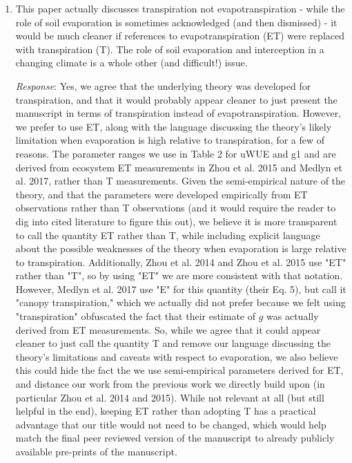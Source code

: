 \documentclass[12pt]{article}
\begin{document}
\begin{enumerate}

\item This paper actually discusses transpiration not
  evapotranspiration - while the role of soil evaporation is sometimes
  acknowledged (and then dismissed) - it would be much cleaner if
  references to evapotranspiration (ET) were replaced with
  transpiration (T). The role of soil evaporation and interception in
  a changing climate is a whole other (and difficult!) issue.

  \textit{Response}: Yes, we agree that the underlying theory was
  developed for transpiration, and that it would probably appear
  cleaner to just present the manuscript in terms of transpiration
  instead of evapotranspiration. However, we prefer to use ET, along
  with the language discussing the theory's likely limitation when
  evaporation is high relative to transpiration, for a few of
  reasons. The parameter ranges we use in Table 2 for uWUE and g1 and
  are derived from ecosystem ET measurements in Zhou et al. 2015 and
  Medlyn et al. 2017, rather than T measurements. Given the
  semi-empirical nature of the theory, and that the parameters were
  developed empirically from ET observations rather than T
  observations (and it would require the reader to dig into cited
  literature to figure this out), we believe it is more transparent to
  call the quantity ET rather than T, while including explicit
  language about the possible weaknesses of the theory when
  evaporation is large relative to transpiration. Additionally, Zhou
  et al. 2014 and Zhou et al. 2015 use "ET" rather than "T", so by
  using "ET" we are more consistent with that notation. However,
  Medlyn et al. 2017 use "E" for this quantity (their Eq. 5), but call
  it "canopy transpiration," which we actually did not prefer because
  we felt using "transpiration" obfuscated the fact that their
  estimate of $g$ was actually derived from ET measurements. So, while
  we agree that it could appear cleaner to just call the quantity T
  and remove our language discussing the theory's limitations and
  caveats with respect to evaporation, we also believe this could hide
  the fact the we use semi-empirical parameters derived for ET, and
  distance our work from the previous work we directly build upon (in
  particular Zhou et al. 2014 and 2015). While not relevant at all
  (but still helpful in the end), keeping ET rather than adopting T
  has a practical advantage that our title would not need to be
  changed, which would help match the final peer reviewed version of
  the manuscript to already publicly available pre-prints of the
  manuscript.


\end{enumerate}
\end{document}
